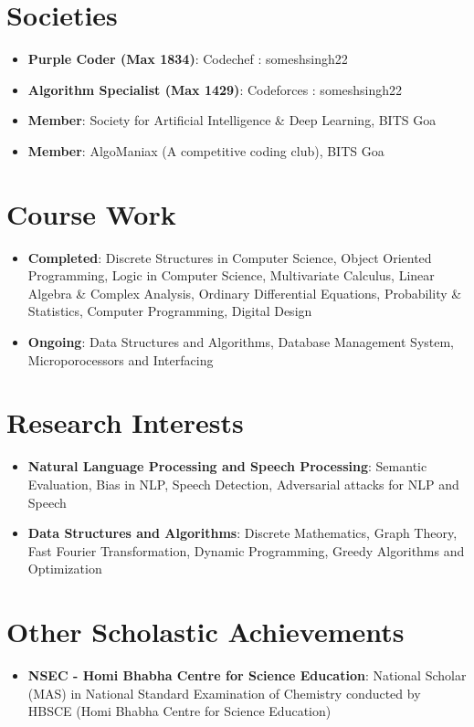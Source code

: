 \documentclass[letterpaper,11pt]{article}
\newcommand{\resumeItem}[2]{
  \item\small{
    \textbf{#1}{: #2 \vspace{-2pt}}
  }
}
\newcommand{\resumeSubItem}[2]{\resumeItem{#1}{#2}\vspace{-4pt}}
\newcommand{\resumeSubHeadingListStart}{\begin{itemize}[leftmargin=*]}
\newcommand{\resumeSubHeadingListEnd}{\end{itemize}}
\begin{document}
\section{Societies}
  \resumeSubHeadingListStart
            \resumeSubItem{Purple Coder (Max 1834)}
    {Codechef : someshsingh22}
    
                \resumeSubItem{Algorithm Specialist (Max 1429)}
    {Codeforces : someshsingh22}
    
        \resumeSubItem{Member}
    {Society for Artificial Intelligence \& Deep Learning, BITS Goa}
    
    \resumeSubItem{Member}
    {AlgoManiax (A competitive coding club), BITS Goa}
    
  \resumeSubHeadingListEnd
%


\section{Course Work}
  \resumeSubHeadingListStart
    \resumeSubItem{Completed}
   {Discrete Structures in Computer Science, Object Oriented Programming, Logic in Computer Science, Multivariate Calculus, Linear Algebra \& Complex Analysis, Ordinary Differential Equations, Probability \& Statistics, Computer Programming, Digital Design}
    \resumeSubItem{Ongoing}
    {Data Structures and Algorithms, Database Management System, Microporocessors and Interfacing}

    
  \resumeSubHeadingListEnd

%
\section{Research Interests}
  \resumeSubHeadingListStart
    \resumeSubItem{Natural Language Processing and Speech Processing}
   {Semantic Evaluation, Bias in NLP, Speech Detection, Adversarial attacks for NLP and Speech}
    \resumeSubItem{Data Structures and Algorithms}
    {Discrete Mathematics, Graph Theory, Fast Fourier Transformation, Dynamic Programming, Greedy Algorithms and Optimization}
  \resumeSubHeadingListEnd
%

%
\section{Other Scholastic Achievements}
  \resumeSubHeadingListStart
    \resumeSubItem{NSEC - Homi Bhabha Centre for Science Education}
   {National Scholar (MAS) in National Standard Examination of Chemistry conducted by HBSCE (Homi Bhabha Centre for Science Education)}
  \resumeSubHeadingListEnd
%
\end{document}
